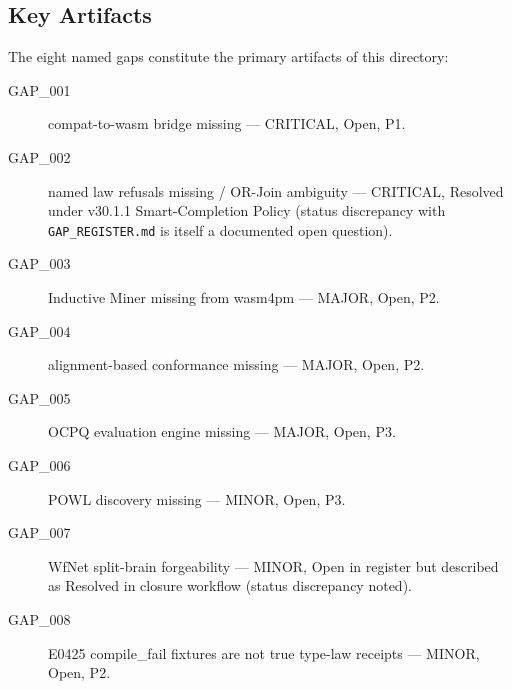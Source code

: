 \subsection{Key Artifacts}
\label{sec:gaps-identity-artifacts}

The eight named gaps constitute the primary artifacts of this directory:

\begin{description}
  \item[GAP\_001] compat-to-wasm bridge missing — CRITICAL, Open, P1.
  \item[GAP\_002] named law refusals missing / OR-Join ambiguity — CRITICAL, Resolved
        under v30.1.1 Smart-Completion Policy (status discrepancy with
        \texttt{GAP\_REGISTER.md} is itself a documented open question).
  \item[GAP\_003] Inductive Miner missing from wasm4pm — MAJOR, Open, P2.
  \item[GAP\_004] alignment-based conformance missing — MAJOR, Open, P2.
  \item[GAP\_005] OCPQ evaluation engine missing — MAJOR, Open, P3.
  \item[GAP\_006] POWL discovery missing — MINOR, Open, P3.
  \item[GAP\_007] WfNet split-brain forgeability — MINOR, Open in register but described
        as Resolved in closure workflow (status discrepancy noted).
  \item[GAP\_008] E0425 compile\_fail fixtures are not true type-law receipts — MINOR,
        Open, P2.
\end{description}
